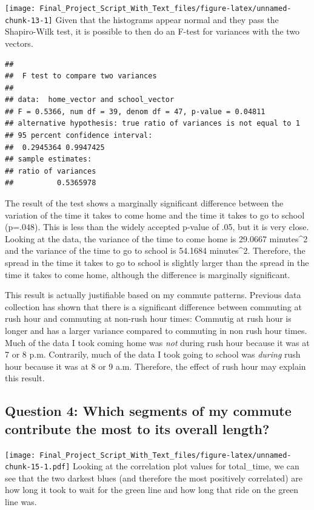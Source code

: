 \documentclass[
]{article}
\begin{document}
\texttt{[image: Final\_Project\_Script\_With\_Text\_files/figure-latex/unnamed-chunk-13-1]}
Given that the histograms appear normal and they pass the Shapiro-Wilk
test, it is possible to then do an F-test for variances with the two
vectors.

\begin{verbatim}
## 
##  F test to compare two variances
## 
## data:  home_vector and school_vector
## F = 0.5366, num df = 39, denom df = 47, p-value = 0.04811
## alternative hypothesis: true ratio of variances is not equal to 1
## 95 percent confidence interval:
##  0.2945364 0.9947425
## sample estimates:
## ratio of variances 
##          0.5365978
\end{verbatim}

The result of the test shows a marginally significant difference between
the variation of the time it takes to come home and the time it takes to
go to school (p=.048). This is less than the widely accepted p-value of
.05, but it is very close. Looking at the data, the variance of the time
to come home is 29.0667 minutes\^{}2 and the variance of the time to go
to school is 54.1684 minutes\^{}2. Therefore, the spread in the time it
takes to go to school is slightly larger than the spread in the time it
takes to come home, although the difference is marginally significant.

This result is actually justifiable based on my commute patterns.
Previous data collection has shown that there is a significant
difference between commuting at rush hour and commuting at non-rush hour
times: Commutig at rush hour is longer and has a larger variance
compared to commuting in non rush hour times. Much of the data I took
coming home was \emph{not} during rush hour because it was at 7 or 8
p.m. Contrarily, much of the data I took going to school was
\emph{during} rush hour because it was at 8 or 9 a.m. Therefore, the
effect of rush hour may explain this result.

\hypertarget{question-4-which-segments-of-my-commute-contribute-the-most-to-its-overall-length}{%
\subsection{Question 4: Which segments of my commute contribute the most
to its overall
length?}\label{question-4-which-segments-of-my-commute-contribute-the-most-to-its-overall-length}}

\texttt{[image: Final\_Project\_Script\_With\_Text\_files/figure-latex/unnamed-chunk-15-1.pdf]}
Looking at the correlation plot values for total\_time, we can see that
the two darkest blues (and therefore the most positively correlated) are
how long it took to wait for the green line and how long that ride on
the green line was.
\end{document}
